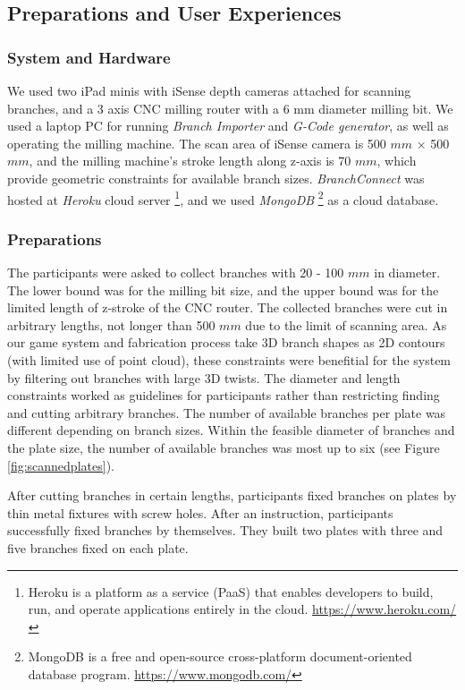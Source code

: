 \subsection{Preparations and User Experiences}
\subsubsection*{System and Hardware}
We used two iPad minis with iSense depth cameras attached for scanning branches, and a 3 axis CNC milling router with a 6 mm diameter milling bit.
We used a laptop PC for running \textit{Branch Importer} and \textit{G-Code generator}, as well as operating the milling machine.
The scan area of iSense camera is 500 $mm$ $\times$ 500 $mm$, and the milling machine's stroke length along z-axis is 70 $mm$, which provide geometric constraints for available branch sizes.
\textit{BranchConnect} was hosted at \textit{Heroku} cloud server \footnote{Heroku is a platform as a service (PaaS) that enables developers to build, run, and operate applications entirely in the cloud. \url{https://www.heroku.com/}},
and we used \textit{MongoDB} \footnote{MongoDB is a free and open-source cross-platform document-oriented database program. \url{https://www.mongodb.com/}} as a cloud database.

\subsubsection*{Preparations}
The participants were asked to collect branches with 20 - 100 $mm$ in diameter.
The lower bound was for the milling bit size, and the upper bound was for the limited length of z-stroke of the CNC router.
The collected branches were cut in arbitrary lengths, not longer than 500 $mm$ due to the limit of scanning area. 
As our game system and fabrication process take 3D branch shapes as 2D contours (with limited use of point cloud), these constraints were benefitial for the system by filtering out branches with large 3D twists.
The diameter and length constraints worked as guidelines for participants rather than restricting finding and cutting arbitrary branches.
The number of available branches per plate was different depending on branch sizes.
Within the feasible diameter of branches and the plate size, the number of available branches was  most up to six (see Figure \ref{fig:scannedplates}).

After cutting branches in certain lengths, participants fixed branches on plates by thin metal fixtures with screw holes.
After an instruction, participants successfully fixed branches by themselves.
They built two plates with three and five branches fixed on each plate.

